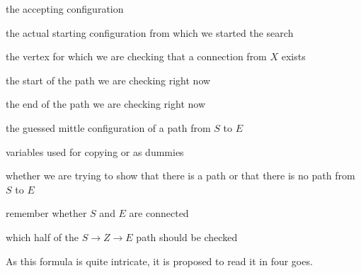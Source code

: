 \begin{description}
    \setlength\itemsep{0.2em}
    \item[$Y$:] the accepting configuration
    \item[$X$:] the actual starting configuration from which we started the search
    \item[$I$:] the vertex for which we are checking that a connection from $X$ exists
    \item[$S$:] the start of the path we are checking right now
    \item[$E$:] the end of the path we are checking right now
    \item[$Z, Z_{e}$:] the guessed mittle configuration of a path from $S$ to $E$
    \item[$A, B, b_{0}$:] variables used for copying or as dummies
    \item[$b_{path}$:] whether we are trying to show that there is a path or that there is no path from $S$ to $E$
    \item[$b_{1}$:] remember whether $S$ and $E$ are connected
    \item[$b_{2}, b_{2e}$:] which half of the $S \to Z \to E$ path should be checked
\end{description}
As this formula is quite intricate, it is proposed to read it in four goes.
